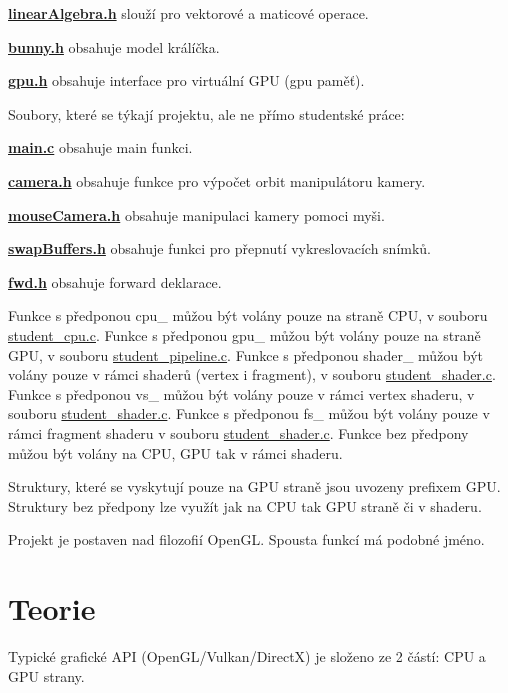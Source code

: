 {\bfseries \hyperlink{linearAlgebra_8h}{linear\-Algebra.\-h}} slouží pro vektorové a maticové operace.

{\bfseries \hyperlink{bunny_8h}{bunny.\-h}} obsahuje model králíčka.

{\bfseries \hyperlink{gpu_8h}{gpu.\-h}} obsahuje interface pro virtuální G\-P\-U (gpu paměť).

Soubory, které se týkají projektu, ale ne přímo studentské práce\-:

{\bfseries \hyperlink{main_8c}{main.\-c}} obsahuje main funkci.

{\bfseries \hyperlink{camera_8h}{camera.\-h}} obsahuje funkce pro výpočet orbit manipulátoru kamery.

{\bfseries \hyperlink{mouseCamera_8h}{mouse\-Camera.\-h}} obsahuje manipulaci kamery pomoci myši.

{\bfseries \hyperlink{swapBuffers_8h}{swap\-Buffers.\-h}} obsahuje funkci pro přepnutí vykreslovacích snímků.

{\bfseries \hyperlink{fwd_8h}{fwd.\-h}} obsahuje forward deklarace.

Funkce s předponou cpu\-\_\- můžou být volány pouze na straně C\-P\-U, v souboru \hyperlink{student__cpu_8c}{student\-\_\-cpu.\-c}. Funkce s předponou gpu\-\_\- můžou být volány pouze na straně G\-P\-U, v souboru \hyperlink{student__pipeline_8c}{student\-\_\-pipeline.\-c}. Funkce s předponou shader\-\_\- můžou být volány pouze v rámci shaderů (vertex i fragment), v souboru \hyperlink{student__shader_8c}{student\-\_\-shader.\-c}. Funkce s předponou vs\-\_\- můžou být volány pouze v rámci vertex shaderu, v souboru \hyperlink{student__shader_8c}{student\-\_\-shader.\-c}. Funkce s předponou fs\-\_\- můžou být volány pouze v rámci fragment shaderu v souboru \hyperlink{student__shader_8c}{student\-\_\-shader.\-c}. Funkce bez předpony můžou být volány na C\-P\-U, G\-P\-U tak v rámci shaderu.

Struktury, které se vyskytují pouze na G\-P\-U straně jsou uvozeny prefixem G\-P\-U. Struktury bez předpony lze využít jak na C\-P\-U tak G\-P\-U straně či v shaderu.

Projekt je postaven nad filozofií Open\-G\-L. Spousta funkcí má podobné jméno.\hypertarget{index_teorie}{}\section{Teorie}\label{index_teorie}
Typické grafické A\-P\-I (Open\-G\-L/\-Vulkan/\-Direct\-X) je složeno ze 2 částí\-: C\-P\-U a G\-P\-U strany.

